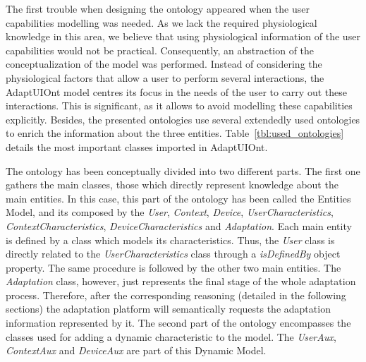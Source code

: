 The first trouble when designing the ontology appeared when the user capabilities
modelling was needed. As we lack the required physiological knowledge in this area,
we believe that using physiological information of the user capabilities would
not be practical. Consequently, an abstraction of the conceptualization of the model was
performed. Instead of considering the physiological factors that allow a user to
perform several interactions, the AdaptUIOnt model centres its focus in the needs
of the user to carry out these interactions. This is significant, as it allows
to avoid modelling these capabilities explicitly. Besides, the presented ontologies
use several extendedly used ontologies to enrich the information about the three
entities. Table~\ref{tbl:used_ontologies} details the most important classes
imported in AdaptUIOnt.

The ontology has been conceptually divided into two different parts. The first
one gathers the main classes, those which directly represent knowledge about
the main entities. In this case, this part of the ontology has been called the
Entities Model, and its composed by the \textit{User}, \textit{Context},
\textit{Device}, \textit{UserCharacteristics}, \textit{ContextCharacteristics},
\textit{DeviceCharacteristics} and \textit{Adaptation}. Each main entity is
defined by a class which models its characteristics. Thus, the \textit{User}
class is directly related to the \textit{UserCharacteristics} class through a
\textit{isDefinedBy} object property. The same procedure is followed by the other
two main entities. The \textit{Adaptation} class, however, just represents the
final stage of the whole adaptation process. Therefore, after the corresponding
reasoning (detailed in the following sections) the adaptation platform will
semantically requests the adaptation information represented by it. The second part
of the ontology encompasses the classes used for adding a dynamic characteristic
to the model. The \textit{UserAux}, \textit{ContextAux} and \textit{DeviceAux}
are part of this Dynamic Model.
